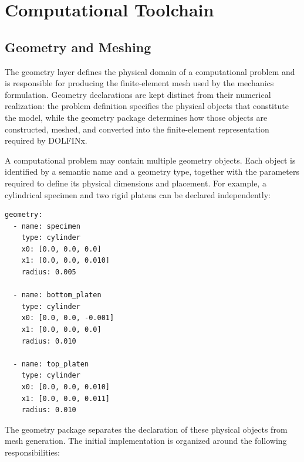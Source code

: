 \section{Computational Toolchain}

\subsection{Geometry and Meshing}

The geometry layer defines the physical domain of a computational problem and is responsible for producing the finite-element mesh used by the mechanics formulation. Geometry declarations are kept distinct from their numerical realization: the problem definition specifies the physical objects that constitute the model, while the geometry package determines how those objects are constructed, meshed, and converted into the finite-element representation required by DOLFINx.

A computational problem may contain multiple geometry objects. Each object is identified by a semantic name and a geometry type, together with the parameters required to define its physical dimensions and placement. For example, a cylindrical specimen and two rigid platens can be declared independently:

\begin{verbatim}
geometry:
  - name: specimen
    type: cylinder
    x0: [0.0, 0.0, 0.0]
    x1: [0.0, 0.0, 0.010]
    radius: 0.005

  - name: bottom_platen
    type: cylinder
    x0: [0.0, 0.0, -0.001]
    x1: [0.0, 0.0, 0.0]
    radius: 0.010

  - name: top_platen
    type: cylinder
    x0: [0.0, 0.0, 0.010]
    x1: [0.0, 0.0, 0.011]
    radius: 0.010
\end{verbatim}

The geometry package separates the declaration of these physical objects from mesh generation. The initial implementation is organized around the following responsibilities:

